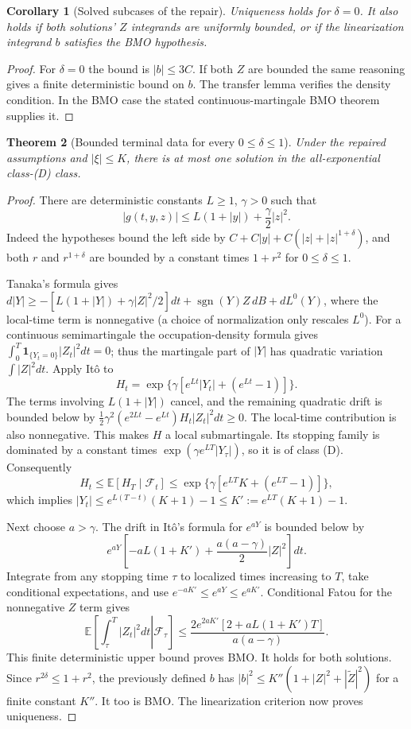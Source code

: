 \documentclass[11pt,a4paper]{article}
\newcommand{\E}{\mathbb E}
\newcommand{\F}{\mathcal F}
\newcommand{\ind}{\mathbf 1}
\newcommand{\sgn}{\operatorname{sgn}}
\newtheorem{theorem}{Theorem}
\newtheorem{corollary}[theorem]{Corollary}
\theoremstyle{definition}
\begin{document}
\begin{corollary}[Solved subcases of the repair]
Uniqueness holds for $\delta=0$. It also holds if both solutions' $Z$ integrands are uniformly bounded, or if the linearization integrand $b$ satisfies the BMO hypothesis.
\end{corollary}
\begin{proof}
For $\delta=0$ the bound is $|b|\le3C$. If both $Z$ are bounded the same reasoning gives a finite deterministic bound on $b$. The transfer lemma verifies the density condition. In the BMO case the stated continuous-martingale BMO theorem supplies it.
\end{proof}

\begin{theorem}[Bounded terminal data for every $0\le\delta\le1$]
Under the repaired assumptions and $|\xi|\le K$, there is at most one solution in the all-exponential class-(D) class.
\end{theorem}
\begin{proof}
There are deterministic constants $L\ge1$, $\gamma>0$ such that
\[
 |g(t,y,z)|\le L(1+|y|)+\frac\gamma2|z|^2.
\]
Indeed the hypotheses bound the left side by
$C+C|y|+C(|z|+|z|^{1+\delta})$, and both $r$ and $r^{1+\delta}$ are bounded by a constant times $1+r^2$ for $0\le\delta\le1$.

Tanaka's formula gives
$d|Y|\ge-[L(1+|Y|)+\gamma|Z|^2/2]dt+\sgn(Y)Z\,dB+dL^0(Y)$,
where the local-time term is nonnegative (a choice of normalization only rescales $L^0$). For a continuous semimartingale the occupation-density formula gives
$\int_0^T\ind_{\{Y_t=0\}}|Z_t|^2dt=0$; thus the martingale part of $|Y|$ has quadratic variation $\int|Z|^2dt$.
Apply It\^o to
\[
 H_t=\exp\{\gamma[e^{Lt}|Y_t|+(e^{Lt}-1)]\}.
\]
The terms involving $L(1+|Y|)$ cancel, and the remaining quadratic drift is bounded below by
$\frac12\gamma^2(e^{2Lt}-e^{Lt})H_t|Z_t|^2dt\ge0$.
The local-time contribution is also nonnegative. This makes $H$ a local submartingale. Its stopping family is dominated by a constant times $\exp(\gamma e^{LT}|Y_\tau|)$, so it is of class (D). Consequently
\[
 H_t\le\E[H_T\mid\F_t]
 \le\exp\{\gamma[e^{LT}K+(e^{LT}-1)]\},
\]
which implies
$|Y_t|\le e^{L(T-t)}(K+1)-1\le K':=e^{LT}(K+1)-1$.

Next choose $a>\gamma$. The drift in It\^o's formula for $e^{aY}$ is bounded below by
\[
 e^{aY}\left[-aL(1+K')+\frac{a(a-\gamma)}2|Z|^2\right]dt.
\]
Integrate from any stopping time $\tau$ to localized times increasing to $T$, take conditional expectations, and use $e^{-aK'}\le e^{aY}\le e^{aK'}$. Conditional Fatou for the nonnegative $Z$ term gives
\[
 \E\left[\left.\int_\tau^T|Z_t|^2dt\right|\F_\tau\right]
 \le\frac{2e^{2aK'}[2+aL(1+K')T]}{a(a-\gamma)}.
\]
This finite deterministic upper bound proves BMO. It holds for both solutions. Since $r^{2\delta}\le1+r^2$, the previously defined $b$ has $|b|^2\le K''(1+|Z|^2+|\widetilde Z|^2)$ for a finite constant $K''$. It too is BMO. The linearization criterion now proves uniqueness.
\end{proof}
\end{document}
